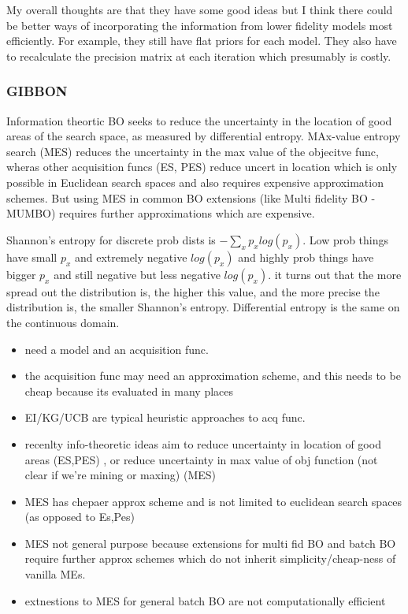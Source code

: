 \documentclass{article}
\begin{document}
My overall thoughts are that they have some good ideas but I think there could be better ways of incorporating the information from lower fidelity models most efficiently. For example, they still have flat priors for each model. They also have to recalculate the precision matrix at each iteration which presumably is costly. 

\subsubsection{GIBBON}

Information theortic BO seeks to reduce the uncertainty in the location of good areas of the search space, as measured by differential entropy. MAx-value entropy search (MES) reduces the uncertainty in the max value of the objecitve func, wheras other acquisition funcs (ES, PES) reduce uncert in location which is only possible in Euclidean search spaces and also requires expensive approximation schemes. But using MES in common BO extensions (like Multi fidelity BO - MUMBO) requires further approximations which are expensive.

Shannon's entropy for discrete prob dists is $-\sum_{x} p_x log (p_x)$. Low prob things have small $p_x$ and extremely negative $log(p_x)$ and highly prob things have bigger $p_x$ and still negative but less negative $log(p_x)$. it turns out that the more spread out the distribution is, the higher this value, and the more precise the distribution is, the smaller Shannon's entropy. Differential entropy is the same on the continuous domain. 

\begin{itemize}
 \item need a model and an acquisition func. 
 \item the acquisition func may need an approximation scheme, and this needs to be cheap because its evaluated in many places
 \item EI/KG/UCB are typical heuristic approaches to acq func. 
 \item recenlty info-theoretic ideas aim to reduce uncertainty in location of good areas (ES,PES) , or reduce uncertainty in max value of obj function (not clear if we're mining or maxing) (MES) 
 \item MES has chepaer approx scheme and is not limited to euclidean search spaces (as opposed to Es,Pes)
 \item MES not general purpose because extensions for multi fid BO and batch BO require further approx schemes which do not inherit simplicity/cheap-ness of vanilla MEs.
 \item extnestions to MES for general batch BO are not computationally efficient
\end{itemize}
\end{document}
